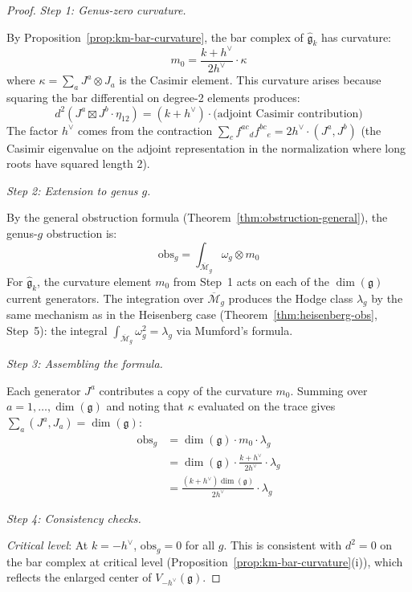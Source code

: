 \begin{proof}

\emph{Step 1: Genus-zero curvature.}

By Proposition~\ref{prop:km-bar-curvature}, the bar complex
of $\widehat{\mathfrak{g}}_k$ has curvature:
\begin{equation}\label{eq:km-curvature-recall}
m_0 = \frac{k + h^\vee}{2h^\vee} \cdot \kappa
\end{equation}
where $\kappa = \sum_a J^a \otimes J_a$ is the Casimir element.  This curvature arises
because squaring the bar differential on degree-2 elements produces:
\[d^2(J^a \boxtimes J^b \cdot \eta_{12}) = (k + h^\vee) \cdot
\bigl(\text{adjoint Casimir contribution}\bigr)\]
The factor $h^\vee$ comes from the contraction
$\sum_c f^{ac}{}_d f^{bc}{}_e = 2h^\vee \cdot (J^a, J^b)$
(the Casimir eigenvalue on the adjoint representation in the normalization where
long roots have squared length 2).

\emph{Step 2: Extension to genus $g$.}

By the general obstruction formula (Theorem~\ref{thm:obstruction-general}), the genus-$g$
obstruction is:
\[\text{obs}_g = \int_{\overline{\mathcal{M}}_g} \omega_g \otimes m_0\]
For $\widehat{\mathfrak{g}}_k$, the curvature element $m_0$ from Step~1 acts on each of the $\dim(\mathfrak{g})$ current generators.
The integration over $\overline{\mathcal{M}}_g$ produces the Hodge class $\lambda_g$
by the same mechanism as in the Heisenberg case (Theorem~\ref{thm:heisenberg-obs}, Step~5):
the integral $\int_{\overline{\mathcal{M}}_g} \omega_g^2 = \lambda_g$ via Mumford's formula.

\emph{Step 3: Assembling the formula.}

Each generator $J^a$ contributes a copy of the curvature $m_0$.  Summing over
$a = 1, \ldots, \dim(\mathfrak{g})$ and noting that $\kappa$ evaluated on the trace gives
$\sum_a (J^a, J_a) = \dim(\mathfrak{g})$:
\begin{align}
\text{obs}_g &= \dim(\mathfrak{g}) \cdot m_0 \cdot \lambda_g \\
&= \dim(\mathfrak{g}) \cdot \frac{k+h^\vee}{2h^\vee} \cdot \lambda_g \\
&= \frac{(k+h^\vee)\dim(\mathfrak{g})}{2h^\vee} \cdot \lambda_g
\end{align}

\emph{Step 4: Consistency checks.}

\emph{Critical level}: At $k = -h^\vee$, $\text{obs}_g = 0$ for all $g$. This is consistent
with $d^2 = 0$ on the bar complex at critical level (Proposition~\ref{prop:km-bar-curvature}(i)),
which reflects the enlarged center of $V_{-h^\vee}(\mathfrak{g})$.


\end{proof}
